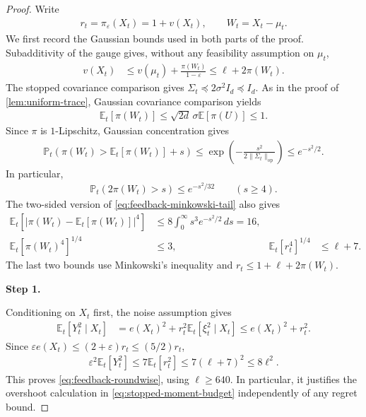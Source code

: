 \documentclass{article}
\newcommand{\proofstepinline}[1]{%
    {\normalfont\normalsize\bfseries\color{blue!55!black}Step #1.}\enspace
}
\newcommand{\E}{\mathbb E}
\newcommand{\Pp}{\mathbb P}
\newcommand{\op}{\mathrm{op}}
\newcommand{\1}{\mathbf 1}
\newcommand{\eps}{\varepsilon}
\begin{document}
\begin{proof}
    Write
    \begin{align}
        r_t=\pi_\eps(X_t)=1+v(X_t),
        \qquad W_t=X_t-\mu_t.
    \end{align}
    We first record the Gaussian bounds used in both parts of the proof.
    Subadditivity of the gauge gives, without any feasibility assumption
    on $\mu_t$,
    \begin{align}
        v(X_t)
         & \leq v(\mu_t)+\frac{\pi(W_t)}{1-\eps}
        \leq \ell+2\pi(W_t).
        \label{eq:feedback-v-minkowski}
    \end{align}
    The stopped covariance comparison gives
    $\Sigma_t\preceq2\sigma^2I_d\preceq I_d$. As in the proof of
    \cref{lem:uniform-trace}, Gaussian covariance comparison yields
    \begin{align}
        \E_t[\pi(W_t)]
        \leq\sqrt{2d}\,\sigma\E[\pi(U)]\leq1.
        \label{eq:feedback-minkowski-mean}
    \end{align}
    Since $\pi$ is $1$-Lipschitz, Gaussian concentration gives
    \begin{align}
        \Pp_t\left(\pi(W_t)>\E_t[\pi(W_t)]+s\right)
        \leq\exp\left(-\frac{s^2}{2\|\Sigma_t\|_{\op}}\right)
        \leq e^{-s^2/2}.
        \label{eq:feedback-minkowski-tail}
    \end{align}
    In particular,
    \begin{align}
        \Pp_t(2\pi(W_t)>s)\leq e^{-s^2/32}
        \qquad(s\geq4).
        \label{eq:feedback-v-tail}
    \end{align}
    The two-sided version of \eqref{eq:feedback-minkowski-tail} also gives
    \begin{align}
        \E_t\left[\left|\pi(W_t)-\E_t[\pi(W_t)]\right|^4\right]
                               & \leq8\int_0^\infty s^3e^{-s^2/2}\,ds=16,
        \\
        \E_t[\pi(W_t)^4]^{1/4} & \leq3,
                               & \E_t[r_t^4]^{1/4}                        & \leq \ell+7.
        \label{eq:feedback-gauge-moments}
    \end{align}
    The last two bounds use Minkowski's inequality and
    $r_t\leq1+\ell+2\pi(W_t)$.

    \proofstepinline{1}
    Conditioning on $X_t$ first, the noise assumption gives
    \begin{align}
        \E_t[Y_t^2\mid X_t]
         & =e(X_t)^2+r_t^2\E_t[\xi_t^2\mid X_t]
        \leq e(X_t)^2+r_t^2.
        \label{eq:Y2-conditional-simple}
    \end{align}
    Since $\eps e(X_t)\leq(2+\eps)r_t\leq(5/2)r_t$,
    \begin{align}
        \eps^2\E_t[Y_t^2]
        \leq7\E_t[r_t^2]
        \leq7(\ell+7)^2
        \leq8\ell^2.
    \end{align}
    This proves \eqref{eq:feedback-roundwise}, using $\ell\geq640$.
    In particular, it justifies the overshoot calculation in
    \eqref{eq:stopped-moment-budget} independently of any regret bound.


\end{proof}
\end{document}
